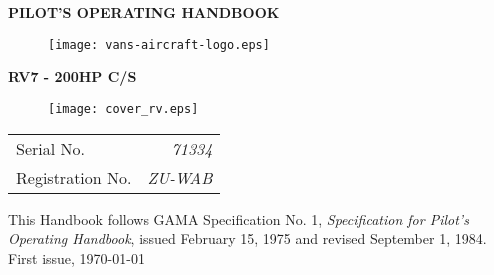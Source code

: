 \thispagestyle{empty}

\begin{center}


\textbf{\LARGE{PILOT'S OPERATING HANDBOOK 
\\[0.5in]
}
}
\end{center}

\begin{figure}[h]
\centering
\texttt{[image: vans-aircraft-logo.eps]}
\label{fig:logo}
\end{figure}

\begin{center}

\textbf{\Huge{RV7 - 200HP C/S}}\\[0.5in]
\end{center}

\begin{figure}[H]
\centering
\texttt{[image: cover\_rv.eps]}
\end{figure}

\begin{center}
\begin{tabular}{ l r }
Serial No. & \textit{71334} \\ 
Registration No. & \textit{ZU-WAB} \\[0.25in]
\end{tabular}
\end{center}


\begin{center}

This Handbook follows GAMA Specification No. 1, \textit{Specification for Pilot's Operating Handbook}, issued February 15, 1975 and revised September 1, 1984.\\[0.25in]

First issue, \today
\end{center}








